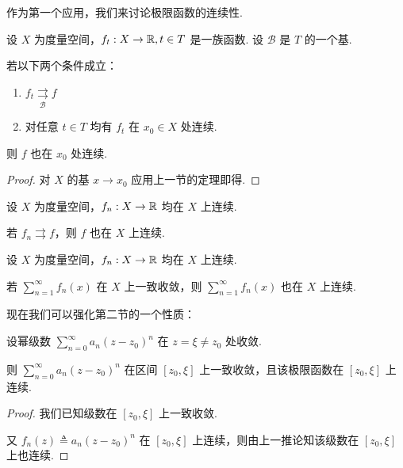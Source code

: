 
作为第一个应用，我们来讨论极限函数的连续性.

\begin{theorem}
    设 $X$ 为度量空间，$f_t:X\to\mathbb{R},t\in T$ 是一族函数. 设 $\mathcal{B}$ 是 $T$ 的一个基.

    若以下两个条件成立：

    \begin{enumerate}
        \item $f_t\underset{\mathcal{B}}{\rightrightarrows}{f}$
        
        \item 对任意 $t\in T$ 均有 $f_t$ 在 $x_0\in X$ 处连续.
    \end{enumerate}

    则 $f$ 也在 $x_0$ 处连续.
\end{theorem}
\begin{proof}
    对 $X$ 的基 $x\to x_0$ 应用上一节的定理即得.
\end{proof}

\begin{inference}
    设 $X$ 为度量空间，$f_n:X\to\mathbb{R}$ 均在 $X$ 上连续.

    若 $f_n\rightrightarrows f$，则 $f$ 也在 $X$ 上连续.
\end{inference}

\begin{inference}
    设 $X$ 为度量空间，$f_n:X\to\mathbb{R}$ 均在 $X$ 上连续.

    若 $\sum\limits_{n=1}^\infty f_n(x)$ 在 $X$ 上一致收敛，则 $\sum\limits_{n=1}^\infty f_n(x)$ 也在 $X$ 上连续.
\end{inference}

现在我们可以强化第二节的一个性质：

\begin{property}[Abel]
    设幂级数 $\sum\limits_{n=0}^\infty a_n(z-z_0)^n$ 在 $z=\xi\ne z_0$ 处收敛.
    
    则 $\sum\limits_{n=0}^\infty a_n(z-z_0)^n$ 在区间 $[z_0,\xi]$ 上一致收敛，且该极限函数在 $[z_0,\xi]$ 上连续.
\end{property}
\begin{proof}
    我们已知级数在 $[z_0,\xi]$ 上一致收敛.

    又 $f_n(z)\triangleq a_n(z-z_0)^n$ 在 $[z_0,\xi]$ 上连续，则由上一推论知该级数在 $[z_0,\xi]$ 上也连续.
\end{proof}

